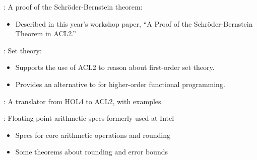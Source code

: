 
\begin{frame}

\newlibtitle

:
A proof of the Schr{\"o}der-Bernstein theorem:
\begin{itemize}
\item Described in this year's workshop paper,
      ``A Proof of the Schr{\"o}der-Bernstein Theorem in {ACL2}.''
\end{itemize}

\end{frame}


\begin{frame}

\newlibtitle

:
Set theory:
\begin{itemize}
\item Supports the use of ACL2 to reason about first-order set theory.
\item Provides an alternative to  for higher-order
      functional programming.
\end{itemize}

\end{frame}


\begin{frame}

\newlibtitle

:
A translator from HOL4 to ACL2, with examples.

\end{frame}


\begin{frame}

\newlibtitle

:
Floating-point arithmetic specs formerly used at Intel
\begin{itemize}
\item Specs for core arithmetic operations and rounding
\item Some theorems about rounding and error bounds
\end{itemize}

\end{frame}

